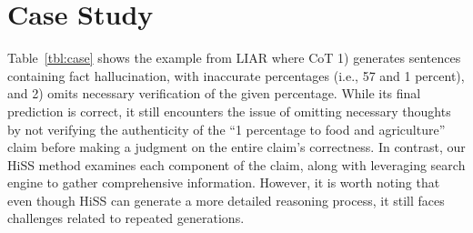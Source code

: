 \documentclass[11pt]{article}
\begin{document}
\appendix

\section{Case Study}
Table~\ref{tbl:case} shows the example from LIAR where CoT 1) generates sentences containing fact hallucination, with inaccurate percentages (i.e., 57 and 1 percent), and 2) omits necessary verification of the given percentage. While its final prediction is correct, it still encounters the issue of omitting necessary thoughts by not verifying the authenticity of the ``1 percentage to food and agriculture'' claim before making a judgment on the entire claim's correctness. In contrast, our HiSS method examines each component of the claim, along with leveraging search engine to gather comprehensive information. However, it is worth noting that even though HiSS can generate a more detailed reasoning process, it still faces challenges related to repeated generations.
\end{document}

